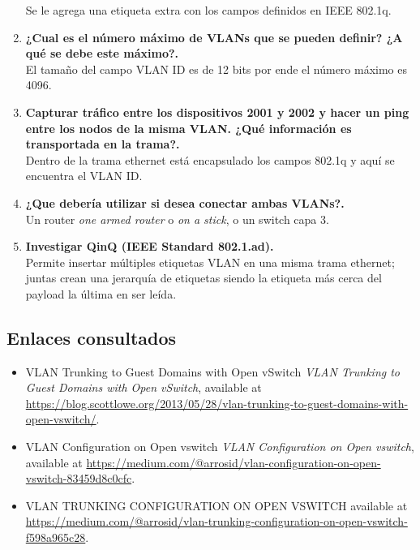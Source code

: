 \documentclass[letterpaper,12pt]{article}
\begin{document}
\begin{enumerate}
	Se le agrega una etiqueta extra con los campos definidos en IEEE 802.1q.
	\item \textbf{¿Cual es el número máximo de VLANs que se pueden definir? ¿A qué se debe este máximo?.} \\
	El tamaño del campo VLAN ID es de 12 bits por ende el número máximo es 4096. 
	\item \textbf{Capturar tráfico entre los dispositivos 2001 y 2002 y hacer un ping entre los nodos de la misma VLAN. ¿Qué información es transportada en la trama?.} \\
	Dentro de la trama ethernet está encapsulado los campos 802.1q y aquí se encuentra el VLAN ID. \\
	\item \textbf{¿Que debería utilizar si desea conectar ambas VLANs?.} \\
	Un router \textit{one armed router} o \textit{on a stick}, o un switch capa 3.\\
	\item \textbf{Investigar QinQ (IEEE Standard 802.1.ad).} \\
	Permite insertar múltiples etiquetas VLAN en una misma trama ethernet; juntas crean una jerarquía de etiquetas siendo la etiqueta más cerca del payload la última en ser leída.
\end{enumerate}
\subsection{Enlaces consultados}
\begin{itemize}
    \item{VLAN Trunking to Guest Domains with Open vSwitch} \emph{VLAN Trunking to Guest Domains with Open vSwitch},  available at \url{https://blog.scottlowe.org/2013/05/28/vlan-trunking-to-guest-domains-with-open-vswitch/}.
    
    \item{VLAN Configuration on Open vswitch} \emph{VLAN Configuration on Open vswitch},  available at \url{https://medium.com/@arrosid/vlan-configuration-on-open-vswitch-83459d8c0cfc}.
    
    \item{VLAN TRUNKING CONFIGURATION ON OPEN VSWITCH} available at \url{https://medium.com/@arrosid/vlan-trunking-configuration-on-open-vswitch-f598a965c28}.
\end{itemize}
\end{document}
